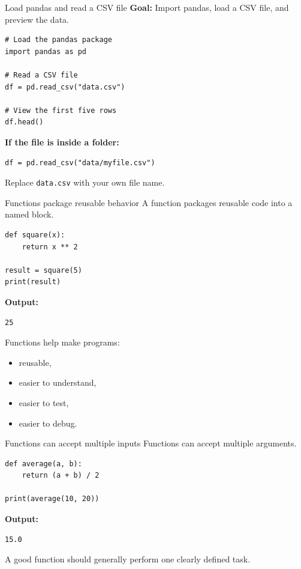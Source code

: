 \documentclass[11pt,aspectratio=43]{beamer}
\begin{document}
\begin{frame}[fragile]{Load pandas and read a CSV file}
\textbf{Goal:} Import pandas, load a CSV file, and preview the data.

\vspace{0.4em}
\begin{lstlisting}
# Load the pandas package
import pandas as pd

# Read a CSV file
df = pd.read_csv("data.csv")

# View the first five rows
df.head()
\end{lstlisting}

\vspace{0.4em}
\textbf{If the file is inside a folder:}

\begin{lstlisting}
df = pd.read_csv("data/myfile.csv")
\end{lstlisting}

\vspace{0.3em}
Replace \texttt{data.csv} with your own file name.
\end{frame}

\begin{frame}[fragile]{Functions package reusable behavior}
A function packages reusable code into a named block.

\begin{lstlisting}
def square(x):
    return x ** 2

result = square(5)
print(result)
\end{lstlisting}

\textbf{Output:}

\begin{lstlisting}
25
\end{lstlisting}

Functions help make programs:
\begin{itemize}
  \item reusable,
  \item easier to understand,
  \item easier to test,
  \item easier to debug.
\end{itemize}
\end{frame}

\begin{frame}[fragile]{Functions can accept multiple inputs}
Functions can accept multiple arguments.

\begin{lstlisting}
def average(a, b):
    return (a + b) / 2

print(average(10, 20))
\end{lstlisting}

\textbf{Output:}

\begin{lstlisting}
15.0
\end{lstlisting}

\vspace{0.2cm}
A good function should generally perform one clearly defined task.
\end{frame}
\end{document}
